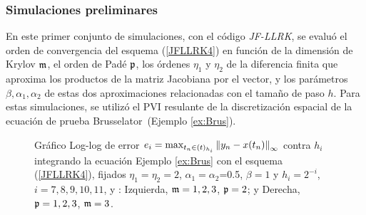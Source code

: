 \subsubsection{Simulaciones preliminares}
En este primer conjunto de simulaciones, con el código \textit{JF-LLRK}, se evaluó el orden de convergencia del esquema (\ref{JFLLRK4}) en función de la dimensión de Krylov $\mathfrak{m}$, el orden de Padé $\mathfrak{p}$, los órdenes $\eta_1$ y $\eta_2$ de la diferencia finita que aproxima los productos de la matriz Jacobiana por el vector, y los parámetros $\beta,\alpha_1,\alpha_2$ de estas dos aproximaciones relacionadas con el tamaño de paso $h$. Para estas simulaciones, se utilizó el PVI resulante de la discretización espacial de la ecuación de prueba  Brusselator~(Ejemplo \ref{ex:Brus}).

\begin{figure}[htb]
	\centering
	\caption{Gráfico Log-log de error ${e_i=\max_{t_n\in(t)_{h_i}}\left\lVert y_n-x(t_n) \right\rVert_\infty}$ contra $h_i$ integrando la ecuación Ejemplo \ref{ex:Brus} con el esquema (\ref{JFLLRK4}), fijados $\eta_1=\eta_2=2$, $\alpha_1=\alpha_2$=0.5, $\beta=1$ y $h_i=2^{-i}$, $i=7,8,9,10,11$, y : Izquierda, $\mathfrak{m}=1,2,3$, $\mathfrak{p}=2$; y Derecha, $\mathfrak{p}=1,2,3$, $\mathfrak{m}=3$.} \label{Fig1}
\end{figure}

